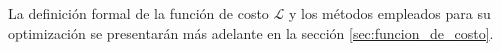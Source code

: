 La definición formal de la función de costo $\mathcal{L}$ y los métodos empleados para su optimización se presentarán más adelante en la sección \ref{sec:funcion_de_costo}.





